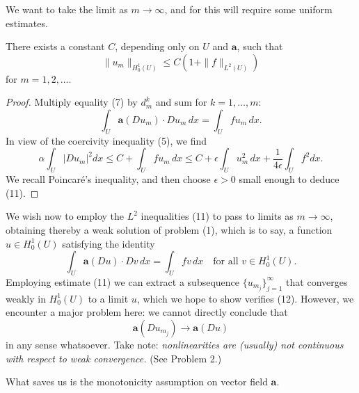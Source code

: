 We want to take the limit as $m \to \infty$, and for this will require some uniform estimates.

\begin{theorem}
\label{thm:monotonicity-energy-estimates}
There exists a constant $C$, depending only on $U$ and $\mathbf{a}$, such that
\[
\|u_m\|_{H^1_0(U)} \leq C(1 + \|f\|_{L^2(U)})
\tag{11}
\]
for $m = 1, 2, \ldots$.
\end{theorem}
\begin{proof}
Multiply equality (7) by $d^k_m$ and sum for $k = 1, \ldots, m$:
\[
\int_U \mathbf{a}(Du_m) \cdot Du_m \, dx = \int_U f u_m \, dx.
\]
In view of the coercivity inequality (5), we find
\[
\alpha \int_U |Du_m|^2 dx \leq C + \int_U f u_m \, dx \leq C + \epsilon \int_U u^2_m \, dx + \frac{1}{4\epsilon} \int_U f^2 dx.
\]
We recall Poincaré's inequality, and then choose $\epsilon > 0$ small enough to deduce (11).
\end{proof}

We wish now to employ the $L^2$ inequalities (11) to pass to limits as $m \to \infty$, obtaining thereby a weak solution of problem (1), which is to say, a function $u \in H^1_0(U)$ satisfying the identity
\[
\int_U \mathbf{a}(Du) \cdot Dv \, dx = \int_U fv \, dx \quad \text{for all } v \in H^1_0(U).
\tag{12}
\]
Employing estimate (11) we can extract a subsequence $\{u_{m_j}\}_{j=1}^\infty$ that converges weakly in $H^1_0(U)$ to a limit $u$, which we hope to show verifies (12). However, we encounter a major problem here: we cannot directly conclude that
\[
\mathbf{a}(Du_{m_j}) \to \mathbf{a}(Du)
\]
in any sense whatsoever. Take note: \textit{nonlinearities are (usually) not continuous with respect to weak convergence.} (See Problem 2.)

What saves us is the monotonicity assumption on vector field $\mathbf{a}$.

